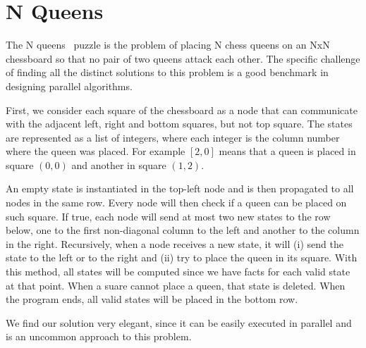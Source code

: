 \section{N Queens}

The N queens~\cite{8queens} puzzle is the problem of placing N chess queens on an NxN chessboard so
that no pair of two queens attack each other. The specific challenge of finding all the distinct
solutions to this problem is a good benchmark in designing parallel algorithms.

First, we consider each square of the chessboard as a node
that can communicate with the adjacent left, right and bottom squares, but not top square.
The states are represented as a list of integers, where each integer is the column number where
the queen was placed. For example $[2, 0]$ means that a queen is placed in square $(0, 0)$ and another in square $(1, 2)$.

An empty state is instantiated in the top-left node and is then propagated to all nodes in the same row.
Every node will then check if a queen can be placed on such square. If true, each node will send at most
two new states to the row below, one to the first non-diagonal column to the left and another to the column
in the right.
Recursively, when a node receives a new state, it will (i) send the state to the left
or to the right and (ii) try to place the queen in its square. With this method,
all states will be computed since we have facts for each valid state
at that point. When a suare cannot place a queen, that state is deleted.
When the program ends, all valid states will be placed in the bottom row.

We find our solution very elegant, since it can be easily executed in parallel and is an uncommon
approach to this problem.

